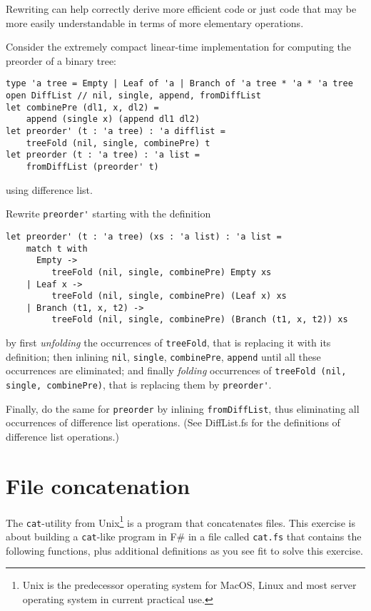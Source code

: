 \documentclass[a4paper,11pt]{article}
\begin{document}
Rewriting can help correctly derive more efficient code or just code that may be more easily understandable in terms of more elementary operations.

Consider the extremely compact linear-time implementation for computing the preorder of a binary tree:
\begin{verbatim}
type 'a tree = Empty | Leaf of 'a | Branch of 'a tree * 'a * 'a tree
open DiffList // nil, single, append, fromDiffList
let combinePre (dl1, x, dl2) = 
    append (single x) (append dl1 dl2)
let preorder' (t : 'a tree) : 'a difflist =
    treeFold (nil, single, combinePre) t
let preorder (t : 'a tree) : 'a list = 
    fromDiffList (preorder' t)
\end{verbatim}
using difference list.

\newpage Rewrite \verb|preorder'| starting with the definition
\begin{verbatim}
let preorder' (t : 'a tree) (xs : 'a list) : 'a list =
    match t with
      Empty -> 
         treeFold (nil, single, combinePre) Empty xs
    | Leaf x -> 
         treeFold (nil, single, combinePre) (Leaf x) xs 
    | Branch (t1, x, t2) -> 
         treeFold (nil, single, combinePre) (Branch (t1, x, t2)) xs 
\end{verbatim}
by first \emph{unfolding} the occurrences of \verb|treeFold|, that is replacing it with its definition; then inlining \verb|nil|, \verb|single|, \verb|combinePre|, \verb|append| until all these occurrences are eliminated; and finally \emph{folding} occurrences of \verb|treeFold (nil, single, combinePre)|, that is replacing them by \verb|preorder'|. 

Finally, do the same for \verb|preorder| by inlining \verb|fromDiffList|, thus eliminating all occurrences of difference list operations.
(See DiffList.fs for the definitions of difference list operations.) 


\section{File concatenation}

The \texttt{cat}-utility from 
Unix\footnote{Unix is the predecessor operating system for MacOS, Linux and most server operating system in current practical use.} 
is a program that concatenates files.  
This exercise is about building a \texttt{cat}-like program in F\# in a file called \texttt{cat.fs} that contains the following functions, plus additional definitions as you see fit to solve this exercise.
\end{document}
